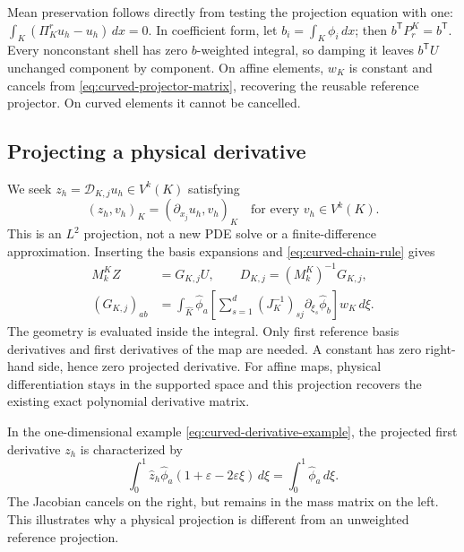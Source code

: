 Mean preservation follows directly from testing the projection equation with
one: $\int_K(\Pi_K^r u_h-u_h)\,dx=0$. In coefficient form, let
$b_i=\int_K\phi_i\,dx$; then $b^{\mathsf T}P_r^K=b^{\mathsf T}$. Every
nonconstant shell has zero $b$-weighted integral, so damping it leaves
$b^{\mathsf T}U$ unchanged component by component. On affine elements,
$w_K$ is constant and cancels from \cref{eq:curved-projector-matrix}, recovering
the reusable reference projector. On curved elements it cannot be cancelled.

\subsection{Projecting a physical derivative}
We seek $z_h=\mathscr D_{K,j}u_h\in V^k(K)$ satisfying
\begin{equation}
 (z_h,v_h)_K=(\partial_{x_j}u_h,v_h)_K
 \quad\text{for every }v_h\in V^k(K).
 \label{eq:curved-derivative-weak}
\end{equation}
This is an $L^2$ projection, not a new PDE solve or a finite-difference
approximation. Inserting the basis expansions and
\cref{eq:curved-chain-rule} gives
\begin{align}
 M_k^K Z&=G_{K,j}U,\qquad D_{K,j}=(M_k^K)^{-1}G_{K,j},\\
 (G_{K,j})_{ab}&=\int_{\widehat K}\widehat\phi_a
  \left[\sum_{s=1}^d(J_K^{-1})_{sj}
                   \partial_{\xi_s}\widehat\phi_b\right]w_K\,d\xi.
 \label{eq:curved-derivative-assembly}
\end{align}
The geometry is evaluated inside the integral. Only first reference
basis derivatives and first derivatives of the map are needed. A constant
has zero right-hand side, hence zero projected derivative. For affine maps,
physical differentiation stays in the supported space and this projection
recovers the existing exact polynomial derivative matrix.

In the one-dimensional example \cref{eq:curved-derivative-example}, the
projected first derivative $z_h$ is characterized by
\begin{equation}
 \int_0^1\widehat z_h\widehat\phi_a
       (1+\varepsilon-2\varepsilon\xi)\,d\xi
 =\int_0^1\widehat\phi_a\,d\xi.
\end{equation}
The Jacobian cancels on the right, but remains in the mass matrix on the left.
This illustrates why a physical projection is different from an unweighted
reference projection.

